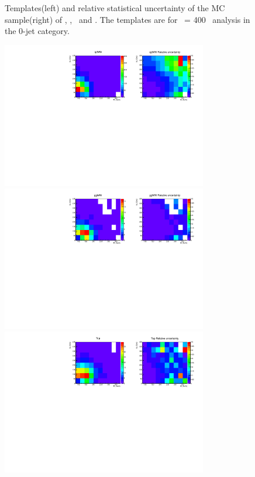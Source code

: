 \begin{figure}[htp]
\caption{Templates(left) and relative statistical uncertainty of the MC sample(right) 
of \qqWH, \qqZH, \qqH\ and \ggH. 
The templates are for \mHi\ = 400 \GeV\ analysis in the 0-jet category.}
\label{fig:2dtemplate_400_0j_1}
\end{figure}

\begin{figure}[htp]
\centering
\includegraphics[width=0.8\textwidth]{figures/2dtemplate_qqWW_mH400_0j.pdf}
\includegraphics[width=0.8\textwidth]{figures/2dtemplate_ggWW_mH400_0j.pdf}
\includegraphics[width=0.8\textwidth]{figures/2dtemplate_Top_mH400_0j.pdf}

\end{figure}
